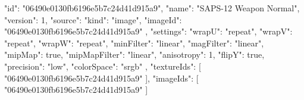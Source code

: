 {
  "id": "06490e0130fb6196e5b7c24d41d915a9",
  "name": "SAPS-12 Weapon Normal",
  "version": 1,
  "source": {
    "kind": "image",
    "imageId": "06490e0130fb6196e5b7c24d41d915a9"
  },
  "settings": {
    "wrapU": "repeat",
    "wrapV": "repeat",
    "wrapW": "repeat",
    "minFilter": "linear",
    "magFilter": "linear",
    "mipMap": true,
    "mipMapFilter": "linear",
    "anisotropy": 1,
    "flipY": true,
    "precision": "low",
    "colorSpace": "srgb"
  },
  "textureIds": [
    "06490e0130fb6196e5b7c24d41d915a9"
  ],
  "imageIds": [
    "06490e0130fb6196e5b7c24d41d915a9"
  ]
}
